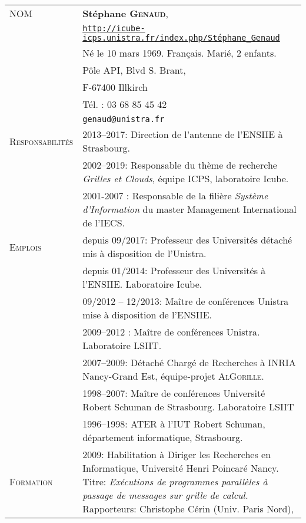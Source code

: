 \setlength{\tabcolsep}{5pt}
\noindent
\begin{tabular}{lp{13.7cm}}
\textsc{NOM}		&{\bf Stéphane \textsc{Genaud}}, \\
			& \texttt{\url{http://icube-icps.unistra.fr/index.php/Stéphane\_Genaud}}\\
			& Né le 10 mars 1969. Français. Marié, 2 enfants. \\
			& Pôle API, Blvd S. Brant,\\
			& F-67400 Illkirch\\
			& Tél. : 03 68 85 45 42\\ 
			& \texttt{genaud@unistra.fr}\\[5mm]
\hline
\textsc{Responsabilités}& 2013--2017: Direction de l'antenne de l'ENSIIE à Strasbourg.\\[2mm]
			& 2002--2019: Responsable du thème de recherche \textit{Grilles et Clouds}, équipe ICPS, laboratoire Icube.\\[2mm]
			& 2001-2007 : Responsable de la filière \textit{Système d'Information} du master Management International de l'IECS.\\[2mm]
\hline
	  \textsc{Emplois} 
			& depuis 09/2017: Professeur des Universités détaché mis à disposition de l'Unistra.\\[2mm]
	            & depuis 01/2014: Professeur des Universités à l'ENSIIE. Laboratoire Icube.\\[2mm]
			& 09/2012 -- 12/2013: Maître de conférences Unistra mise à disposition de l'ENSIIE.\\[2mm]
			& 2009--2012 : Maître de conférences Unistra. Laboratoire LSIIT.\\[2mm]
 	                & 2007--2009: Détaché Chargé de Recherches à INRIA
                          Nancy-Grand Est, équipe-projet \textsc{AlGorille}.\\[2mm]
			& 1998--2007: Maître de conférences Université Robert Schuman de Strasbourg. Laboratoire LSIIT\\[2mm]
			& 1996--1998: ATER à l'IUT Robert Schuman, département informatique, Strasbourg.\\[2mm]
\hline
\textsc{Formation}	& 2009:  Habilitation à Diriger les Recherches en Informatique, Université Henri Poincaré Nancy.
      			  Titre: {\em Exécutions de programmes parallèles à passage de messages sur grille de calcul.}
   				 Rapporteurs: 	Christophe Cérin (Univ. Paris Nord), 

\end{tabular}
